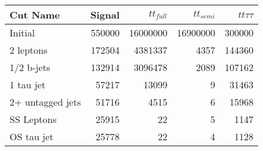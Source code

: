 \begin{tabular}{lrrrr}
\toprule
         Cut Name &  Signal &  $tt_{full}$ &  $tt_{semi}$ &  $tt\tau\tau$ \\
\midrule
          Initial &  550000 &     16000000 &     16900000 &        300000 \\
        2 leptons &  172504 &      4381337 &         4357 &        144360 \\
       1/2 b-jets &  132914 &      3096478 &         2089 &        107162 \\
        1 tau jet &   57217 &        13099 &            9 &         31463 \\
 2+ untagged jets &   51716 &         4515 &            6 &         15968 \\
       SS Leptons &   25915 &           22 &            5 &          1147 \\
       OS tau jet &   25778 &           22 &            4 &          1128 \\
\bottomrule
\end{tabular}
